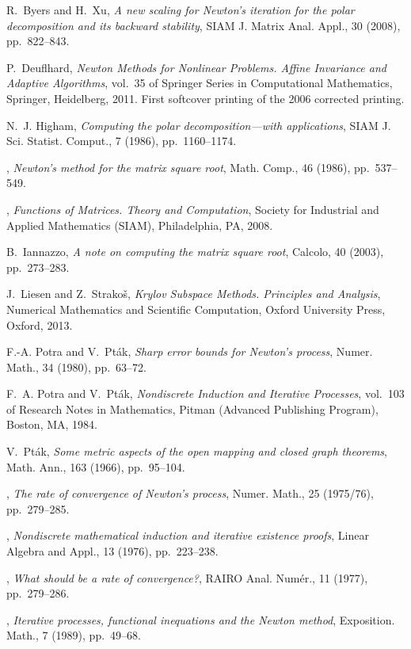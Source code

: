 \documentclass{siamltex}
\begin{document}
\begin{thebibliography}{10}

{\sc R.~Byers and H.~Xu}, {\em A new scaling for {N}ewton's iteration for the
  polar decomposition and its backward stability}, SIAM J. Matrix Anal. Appl.,
  30 (2008), pp.~822--843.

{\sc P.~Deuflhard}, {\em Newton Methods for Nonlinear Problems. Affine
  Invariance and Adaptive Algorithms}, vol.~35 of Springer Series in
  Computational Mathematics, Springer, Heidelberg, 2011.
\newblock First softcover printing of the 2006 corrected printing.

{\sc N.~J. Higham}, {\em Computing the polar decomposition---with
  applications}, SIAM J. Sci. Statist. Comput., 7 (1986), pp.~1160--1174.

\leavevmode\vrule height 2pt depth -1.6pt width 23pt, {\em Newton's method for
  the matrix square root}, Math. Comp., 46 (1986), pp.~537--549.

\leavevmode\vrule height 2pt depth -1.6pt width 23pt, {\em Functions of
  Matrices. Theory and Computation}, Society for Industrial and Applied
  Mathematics (SIAM), Philadelphia, PA, 2008.

{\sc B.~Iannazzo}, {\em A note on computing the matrix square root}, Calcolo,
  40 (2003), pp.~273--283.

{\sc J.~Liesen and Z.~Strako{\v{s}}}, {\em Krylov Subspace Methods. Principles
  and Analysis}, Numerical Mathematics and Scientific Computation, Oxford
  University Press, Oxford, 2013.

{\sc F.-A. Potra and V.~Pt{\'a}k}, {\em Sharp error bounds for {N}ewton's
  process}, Numer. Math., 34 (1980), pp.~63--72.

{\sc F.~A. Potra and V.~Pt{\'a}k}, {\em Nondiscrete Induction and Iterative
  Processes}, vol.~103 of Research Notes in Mathematics, Pitman (Advanced
  Publishing Program), Boston, MA, 1984.

{\sc V.~Pt{\'a}k}, {\em Some metric aspects of the open mapping and closed
  graph theorems}, Math. Ann., 163 (1966), pp.~95--104.

\leavevmode\vrule height 2pt depth -1.6pt width 23pt, {\em The rate of
  convergence of {N}ewton's process}, Numer. Math., 25 (1975/76), pp.~279--285.

\leavevmode\vrule height 2pt depth -1.6pt width 23pt, {\em Nondiscrete
  mathematical induction and iterative existence proofs}, Linear Algebra and
  Appl., 13 (1976), pp.~223--238.

\leavevmode\vrule height 2pt depth -1.6pt width 23pt, {\em What should be a
  rate of convergence?}, RAIRO Anal. Num\'er., 11 (1977), pp.~279--286.

\leavevmode\vrule height 2pt depth -1.6pt width 23pt, {\em Iterative processes,
  functional inequations and the {N}ewton method}, Exposition. Math., 7 (1989),
  pp.~49--68.

\end{thebibliography}
\end{document}
